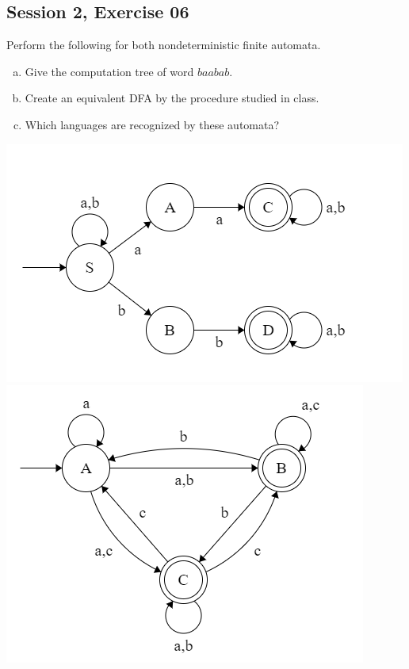\subsection{Session 2, Exercise 06}


Perform the following for both nondeterministic finite automata.
\begin{enumerate}[a.)]
    \item Give the computation tree of word $baabab$.
    \item Create an equivalent DFA by the procedure studied in class.
    \item Which languages are recognized by these automata?
\end{enumerate}

\includegraphics[width=0.5\linewidth]{02/2_6_1_automaton.png}
\includegraphics[width=0.5\linewidth]{02/2_6_2_automaton.png}

